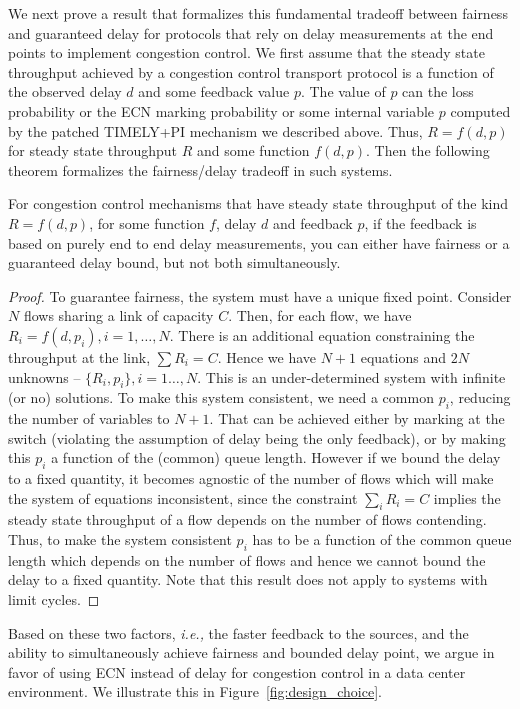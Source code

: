 We next prove a result that formalizes this fundamental tradeoff between fairness
and guaranteed delay for protocols that rely on delay measurements at the end
points to implement congestion control. We first assume that the
steady state throughput achieved by a congestion control transport
protocol is a function of the observed delay $d$ and some feedback
value $p$. The value of $p$ can the loss probability or the ECN marking
probability or some internal variable $p$ computed by the patched
TIMELY+PI mechanism we described above. Thus,
$R = f(d,p)$ for steady state throughput $R$ and some function $f(d,p)$. Then the
following theorem formalizes the fairness/delay tradeoff in such systems.

\begin{thm}
\label{thm:fairness-delay}
For congestion control mechanisms that have steady state throughput of
the kind $R = f(d,p)$, for some function $f$, delay $d$ and
feedback $p$, if the feedback is based on purely end to end
delay measurements, you can either have fairness or a guaranteed delay
bound, but not both simultaneously.
\end{thm}
\begin{proof}
To guarantee fairness, the system must have a
unique fixed point. 
Consider $N$ flows sharing a link of capacity $C$. 
Then, for each flow, we have 
$ R_i = f(d,p_i), i = 1,\ldots,N.$
There is an additional equation constraining the throughput at the
link, $\sum R_i = C$.
Hence we have $N+1$ equations and $2 N$ unknowns -- $\{R_i,p_i\},
 i=1\ldots,N$. This is an under-determined system with infinite (or no)
solutions. To make this system consistent, we need a common $p_i$,
reducing the number of variables to $N+1$. That can be achieved
either by marking at the switch (violating the assumption of delay
being the only feedback), or by making this $p_i$ a function of
the (common) queue length. However if we bound the delay to a fixed quantity,
it becomes agnostic of the number of flows which will make the system
of equations inconsistent, since the constraint $\sum_i R_i = C$
implies the steady state throughput of a flow depends on the number of
flows contending. Thus, to make the system consistent $p_i$ has to be
a function of the common queue length which depends on the number of flows and hence we cannot bound
the delay to a fixed quantity. Note that this result does not apply to systems with
limit cycles\cite{dctcp-analysis}.
\end{proof}

Based on these two factors, {\em i.e.,} the faster feedback to the sources, and
the ability to simultaneously achieve fairness and bounded delay point, we argue
in favor of using ECN instead of delay for congestion control in a data center
environment. We illustrate this in Figure~\ref{fig:design_choice}.

